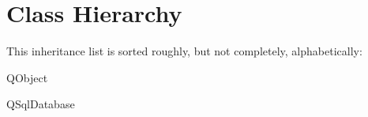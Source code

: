 \section{Class Hierarchy}
This inheritance list is sorted roughly, but not completely, alphabetically\-:\begin{DoxyCompactList}
\item {}
\item Q\-Object\begin{DoxyCompactList}
\item {}
\end{DoxyCompactList}
\item Q\-Sql\-Database\begin{DoxyCompactList}
\item {}
\end{DoxyCompactList}
\end{DoxyCompactList}
